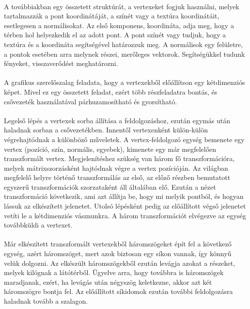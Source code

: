 \documentclass{elteikthesis}
\begin{document}
\paragraph{}
A továbbiakban egy összetett struktúrát, a vertexeket fogjuk használni, melyek tartalmazzák a pont koordinátáját, a színét vagy a textúra koordinátáit, esetlegesen a normálisokat. Az első komponens, koordináta, adja meg, hogy a térben hol helyezkedik el az adott pont. A pont színét vagy tudjuk, hogy a textúra és a koordináta segítségével határozzuk meg. A normálisok egy felületre, a pontok esetében arra melynek részei, merőleges vektorok. Segítségükkel tudunk fényeket, visszaverődést meghatározni.
\paragraph{}
A grafikus szerelőszalag feladata, hogy a vertexekből előállítson egy kétdimenziós képet. Mivel ez egy összetett feladat, ezért több részfeladatra bontás, és csővezeték használatával párhuzamosítható és gyorsítható.
\paragraph{}
Legelső lépés a vertexek sorba állítása a feldolgozáshoz, ezután egymás után haladnak sorban a csővezetékben. Innentől vertexenként külön-külön végrehajtódnak a különböző műveletek. A vertex-feldolgozó egység bemenete egy vertex (pozíció, szín, normális, egyebek), kimenete egy már megfelelően transzformált vertex. Megjelenítéshez szükség van három fő transzformációra, melyek mátrixszorzásként hajtódnak végre a vertex pozícióján. Az világban megfelelő helyre történő transzformálás az első, az előző részben bemutatott egyszerű transzformációk szorzataként áll általában elő. Ezután a nézet transzformáció következik, ami azt állítja be, hogy mi melyik pontból, és hogyan lássuk az elkészített jelenetet. Utolsó lépésként pedig az előállított végső jelenetet vetíti le a kétdimenziós vásznunkra. A három transzformációt elvégezve az egység továbbküldi a vertexet.
\paragraph{}
Már elkészített transzformált vertexekből háromszögeket épít fel a következő egység, azért háromszöget, mert azok biztosan egy síkon vannak, így könnyű velük dolgozni. Az elkészült háromszögekből ezután levágja azokat a részeket, melyek kilógnak a látótérből. Ügyelve arra, hogy továbbra is háromszögek maradjanak, ezért, ha levágás után négyszög keletkezne, akkor azt két háromszögre bontja fel. Az előállított síkidomok ezután további feldolgozásra haladnak tovább a szalagon.
\end{document}
